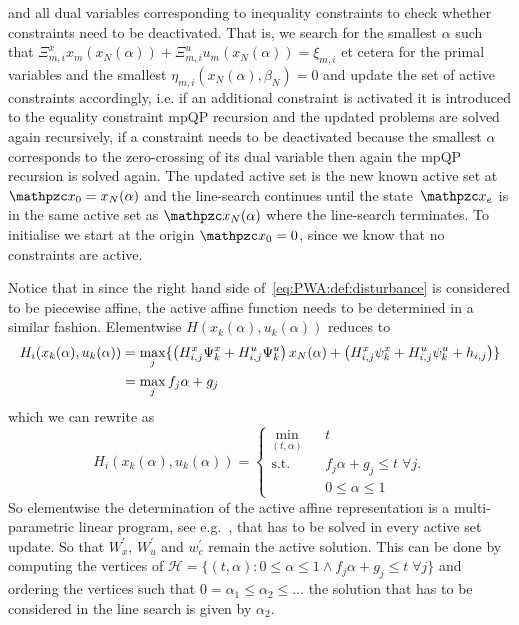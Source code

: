\documentclass{ifacconf}
\newcommand*{\Resize}[1]{\resizebox{\columnwidth}{!}{$#1$}}
\begin{document}
and all dual variables corresponding to inequality constraints to check whether constraints need to be deactivated. That is,
we search for the smallest $\alpha$ such that $\Xi_{m,i}^x x_m(x_N(\alpha))+\Xi_{m,i}^u u_m(x_N(\alpha))=\xi_{m,i}$
et cetera for the primal variables and the smallest $\eta_{m,i}(x_N(\alpha),\beta_N)=0$ and update the set of active
constraints accordingly, i.e. if an additional constraint is activated it is introduced to the equality constraint
mpQP recursion and the updated problems are solved again recursively, if a constraint needs to be deactivated
because the smallest $\alpha$ corresponds to the zero-crossing of its dual variable then again the mpQP recursion 
is solved again. The updated active set is the new known active set at $\mathpzc x_0 = x_N(\alpha)$ and the line-search
continues until the state~$\mathpzc x_e$ is in the same active set as $\mathpzc x_N(\alpha)$ where the line-search terminates.
To initialise we start at the origin $\mathpzc x_0=0$, since we know that no constraints are active. 

Notice that in since the right hand side of~\eqref{eq:PWA:def:disturbance} is considered to be piecewise affine, the active 
affine function needs to be determined in a similar fashion. Elementwise $H(x_k(\alpha),u_k(\alpha))$ reduces to 
\begin{equation}
\Resize{
\begin{split}
	H_i(x_k(\alpha),u_k(\alpha)) &= \max_j\{\left(H^x_{i,j} \Psi^x_k +H^u_{i,j}\Psi^u_k\right)x_N(\alpha) + 
	\left(H^x_{i,j} \psi^x_k +H^u_{i,j}\psi^u_k + h_{i,j}\right) \}\\
	&=\max_j f_j\alpha + g_j
	\end{split}
}
\end{equation}
which we can rewrite as
\begin{equation}\label{eq:definition:as:mpLP}
	H_i(x_k(\alpha),u_k(\alpha)) = \left\{\begin{array}{rcl} \min_{(t,\alpha)}& &t\\
	\text{s.t.}& &f_j\alpha+g_j \leq t\; \forall j.\\
	& &0\leq\alpha\leq1
	\end{array}\right.
\end{equation}
So elementwise the determination of the active affine representation is a multi-parametric linear program, see e.g.~\cite{Gal:1995},
that has to be solved in every active set update. So that $W_x^\prime,\,W_u^\prime$ and $w^\prime_c$ remain the active
solution. This can be done by computing the vertices of $\mathcal H = \{(t,\alpha):0\leq\alpha\leq1\wedge
f_j\alpha+g_j\leq t\;\forall j\}$ and ordering the vertices such that $0=\alpha_1\leq\alpha_2\leq\dots$ the solution
that has to be considered in the line search is given by $\alpha_2$.
\end{document}

